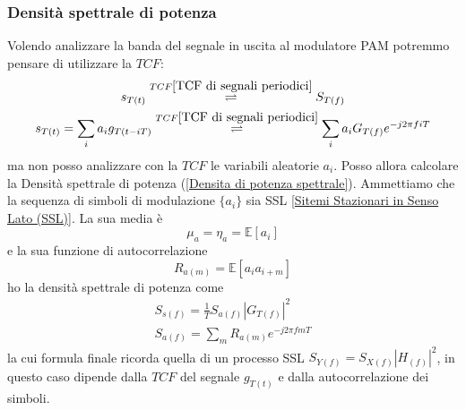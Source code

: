         \subsubsection{Densità spettrale di potenza}\label{Densita spettrale di potenza - PAM}
            Volendo analizzare la banda del segnale in uscita al modulatore PAM potremmo pensare di utilizzare la $TCF$:
            \begin{gather}
                s_{T(t)} \overset{TCF\ref{TCF di segnali periodici}}{\rightleftharpoons} S_{T(f)}\nonumber\\
                s_{T(t)}  = \sum_{i}a_i g_{T(t-iT)} \overset{TCF\ref{TCF di segnali periodici}}{\rightleftharpoons} \sum_{i}a_i G_{T(f)} e^{-j2\pi fiT}  \nonumber
            \end{gather}
            ma non posso analizzare con la $TCF$ le variabili aleatorie $a_i$. Posso allora calcolare la Densità spettrale di potenza (\ref{Densita di potenza spettrale}).
            Ammettiamo che la sequenza di simboli di modulazione $\{a_i\}$ sia SSL \ref{Sitemi Stazionari in Senso Lato (SSL)}. La sua media è
            \[
                \mu_a = \eta_a = \mathbb{E}[a_i]
            \]  
            e la sua funzione di autocorrelazione
            \[
                R_{a(m)} = \mathbb{E}[a_ia_{i+m}]    
            \]
            ho la densità spettrale di potenza come 
            \begin{gather}
                S_{s(f)} = \frac{1}{T} S_{a(f)}\left|G_{T(f)}\right|^2 \nonumber \\
                S_{a(f)} = \sum_{m} R_{a(m)}e^{-j2\pi fmT} \nonumber
            \end{gather}
            la cui formula finale ricorda quella di un processo SSL $S_{Y(f)} = S_{X(f)}\left|H_{(f)}\right|^2$, in questo
            caso dipende dalla $TCF$ del segnale $g_{T(t)}$ e dalla autocorrelazione dei simboli.
